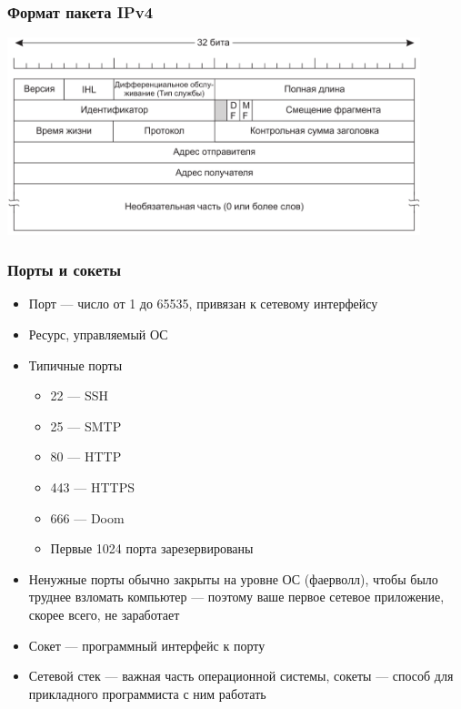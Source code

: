 \documentclass{../../slides-style}
\begin{document}
    \begin{frame}
        \frametitle{Формат пакета IPv4}
        \begin{center}
            \includegraphics[width=0.9\textwidth]{ipv4.png}
        \end{center}
    \end{frame}

    \begin{frame}
        \frametitle{Порты и сокеты}
        \begin{itemize}
            \item Порт --- число от 1 до 65535, привязан к сетевому интерфейсу
            \item Ресурс, управляемый ОС
            \item Типичные порты
            \begin{itemize}
                \item 22 --- SSH
                \item 25 --- SMTP
                \item 80 --- HTTP
                \item 443 --- HTTPS
                \item 666 --- Doom
                \item Первые 1024 порта зарезервированы
            \end{itemize}
            \item Ненужные порты обычно закрыты на уровне ОС (фаерволл), чтобы было труднее взломать компьютер --- поэтому ваше первое сетевое приложение, скорее всего, не заработает
            \item Сокет --- программный интерфейс к порту
            \item Сетевой стек --- важная часть операционной системы, сокеты --- способ для прикладного программиста с ним работать
        \end{itemize}
    \end{frame}
\end{document}
